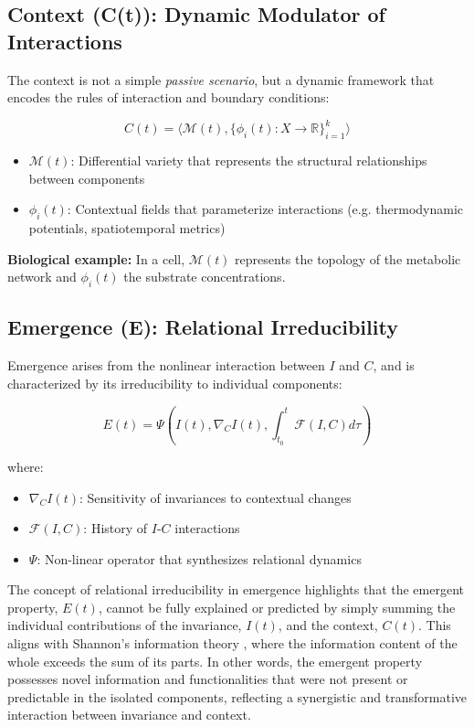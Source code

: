 \documentclass{article}
\begin{document}
\subsection{Context (C(t)): Dynamic Modulator of Interactions}
The context is not a simple \textit{passive scenario}, but a dynamic framework that encodes the rules of interaction and boundary conditions:

\begin{equation}\label{eq:contexto}
C(t) = \langle \mathcal{M}(t), \{\phi_i(t): X \to \mathbb{R}\}_{i=1}^k \rangle
\end{equation}

\begin{itemize}
\item $\mathcal{M}(t)$: Differential variety that represents the structural relationships between components
\item $\phi_i(t)$: Contextual fields that parameterize interactions (e.g. thermodynamic potentials, spatiotemporal metrics)
\end{itemize}

\textbf{Biological example:} In a cell, $\mathcal{M}(t)$ represents the topology of the metabolic network and $\phi_i(t)$ the substrate concentrations.

\subsection{Emergence (E): Relational Irreducibility}
Emergence arises from the nonlinear interaction between $I$ and $C$, and is characterized by its irreducibility to individual components:

\begin{equation}\label{eq:emergencia}
E(t) = \Psi\left(I(t), \nabla_C I(t), \int_{t_0}^t \mathcal{F}(I,C) d\tau\right)
\end{equation}

where:
\begin{itemize}
\item $\nabla_C I(t)$: Sensitivity of invariances to contextual changes
\item $\mathcal{F}(I,C)$: History of $I$-$C$ interactions
\item $\Psi$: Non-linear operator that synthesizes relational dynamics
\end{itemize}

\noindent
The concept of relational irreducibility in emergence highlights that the emergent property, \(E(t)\), cannot be fully explained or predicted by simply summing the individual contributions of the invariance, \(I(t)\), and the context, \(C(t)\). This aligns with Shannon's information theory \cite{Shannon1948}, where the information content of the whole exceeds the sum of its parts. In other words, the emergent property possesses novel information and functionalities that were not present or predictable in the isolated components, reflecting a synergistic and transformative interaction between invariance and context.
\bigskip
\end{document}
